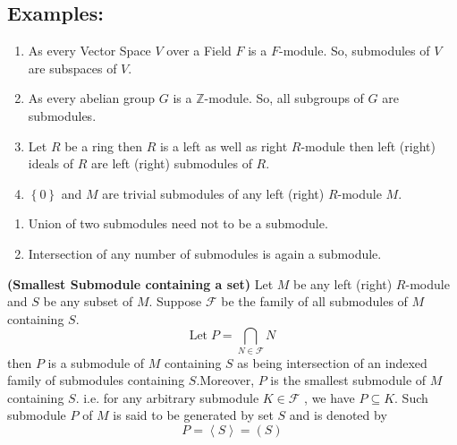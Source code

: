 \subsection{Examples:}
\begin{enumerate}
	\item As every Vector Space $V$ over a Field $F$ is a $F$-module. So, submodules of $V$ are subspaces of $V$.
	\item As every abelian group $G$ is a $\mathbb{Z}$-module. So, all subgroups of $G$ are submodules.
	\item Let $R$ be a ring then $R$ is a left as well as right $R$-module then left (right) ideals of $R$ are left (right) submodules of $R$.
	\item $\left\{0\right\}$ and $M$ are trivial submodules of any left (right) $R$-module $M$.
\end{enumerate}
\bigskip
\begin{remark}\qquad
	\begin{enumerate}
		\item Union of two submodules need not to be a submodule.
		
		\item Intersection of any number of submodules is again a submodule.
	\end{enumerate}
\end{remark}
\bigskip	
\begin{remark}\textbf{(Smallest Submodule containing a set)}\newline
	  		Let $M$ be any left (right) $R$-module and $S$ be any subset of $M$. Suppose $\mathcal{F}$ be the family of all submodules of $M$ containing $S$. \[  \text{Let} \; P=\bigcap_{N \in \mathcal{F}}N  \] then $P$ is a submodule of $M$ containing $S$ as being intersection of an indexed family of submodules containing $S$.\newline \bigskip Moreover, $P$ is the smallest submodule of $M$ containing $S$. i.e. for any arbitrary submodule $K \in \mathcal{F}$ , we have $ P \subseteq K$. Such submodule $P$ of $M$ is said to be generated by set $S$ and is denoted by \[ P = \left\langle S \right\rangle  = (S) \]
\end{remark}
\bigskip
